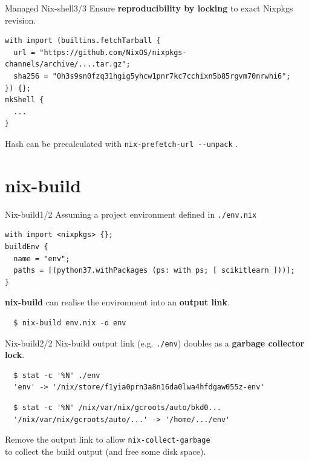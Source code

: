 \documentclass[10pt,aspectratio=169]{beamer}
\begin{document}
\begin{frame}[fragile]{Managed Nix-shell\hfill3/3}
  Ensure \textbf{reproducibility by locking} to exact Nixpkgs revision.
  \begin{verbatim}
with import (builtins.fetchTarball {
  url = "https://github.com/NixOS/nixpkgs-channels/archive/....tar.gz";
  sha256 = "0h3s9sn0fzq31hgig5yhcw1pnr7kc7cchixn5b85rgvm70nrwhi6";
}) {};
mkShell {
  ...
}
  \end{verbatim}
  Hash can be precalculated with \texttt{nix-prefetch-url -{}-unpack} .
\end{frame}


\section{nix-build}


\begin{frame}[fragile]{Nix-build\hfill1/2}
  Assuming a project environment defined in \texttt{./env.nix}
  \begin{verbatim}
with import <nixpkgs> {};
buildEnv {
  name = "env";
  paths = [(python37.withPackages (ps: with ps; [ scikitlearn ]))];
}
  \end{verbatim}
  \textbf{nix-build} can realise the environment into an \textbf{output link}.
  \begin{verbatim}
  $ nix-build env.nix -o env
  \end{verbatim}
\end{frame}


\begin{frame}[fragile]{Nix-build\hfill2/2}
  Nix-build output link (e.g. \texttt{./env}) doubles as a \textbf{garbage collector lock}.
  \begin{verbatim}
  $ stat -c '%N' ./env
  'env' -> '/nix/store/f1yia0prn3a8n16da0lwa4hfdgaw055z-env'
  \end{verbatim}
  \begin{verbatim}
  $ stat -c '%N' /nix/var/nix/gcroots/auto/bkd0...
  '/nix/var/nix/gcroots/auto/...' -> '/home/.../env'
  \end{verbatim}
  Remove the output link to allow \texttt{nix-collect-garbage} \\
  to collect the build output (and free some disk space).
\end{frame}
\end{document}
